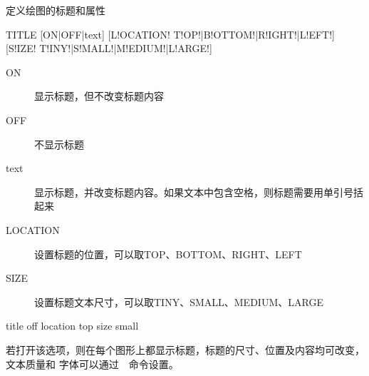 \label{cmd:title}

定义绘图的标题和属性

\begin{SACSTX}
TITLE [ON|OFF|text] [L!OCATION! T!OP!|B!OTTOM!|R!IGHT!|L!EFT!]
    [S!IZE! T!INY!|S!MALL!|M!EDIUM!|L!ARGE!]
\end{SACSTX}

\begin{description}
\item [ON] 显示标题，但不改变标题内容
\item [OFF] 不显示标题
\item [text] 显示标题，并改变标题内容。如果文本中包含空格，则标题需要用单引号括起来
\item [LOCATION] 设置标题的位置，可以取TOP、BOTTOM、RIGHT、LEFT
\item [SIZE] 设置标题文本尺寸，可以取TINY、SMALL、MEDIUM、LARGE
\end{description}

\begin{SACDFT}
title off location top size small
\end{SACDFT}

若打开该选项，则在每个图形上都显示标题，标题的尺寸、位置及内容均可改变，文本质量和
字体可以通过~~命令设置。

